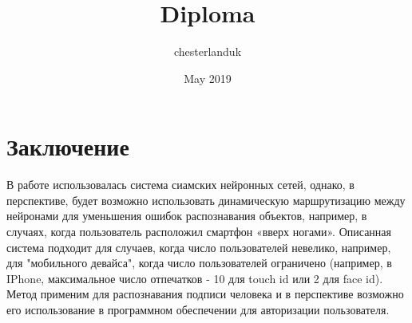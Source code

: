 \documentclass[utf8x]{G7-32} %
\title{Diploma}
\author{chesterlanduk }
\date{May 2019}
\begin{document}
\frontmatter
\setcounter{page}{2}


\tableofcontents



\mainmatter %

% 




















\backmatter %

\chapter{Заключение}

В работе использовалась система сиамских нейронных сетей, однако, в перспективе, будет возможно использовать динамическую маршрутизацию между нейронами для уменьшения ошибок распознавания объектов, например, в случаях, когда пользователь расположил смартфон «вверх ногами».
Описанная система подходит для случаев, когда число пользователей невелико, например, для "мобильного девайса", когда число пользователей ограничено (например, в IPhone, максимальное число отпечатков - 10 для touch id или 2 для face id). 
Метод применим для распознавания подписи человека и в перспективе возможно его использование в программном обеспечении для авторизации пользователя.


\end{document}
